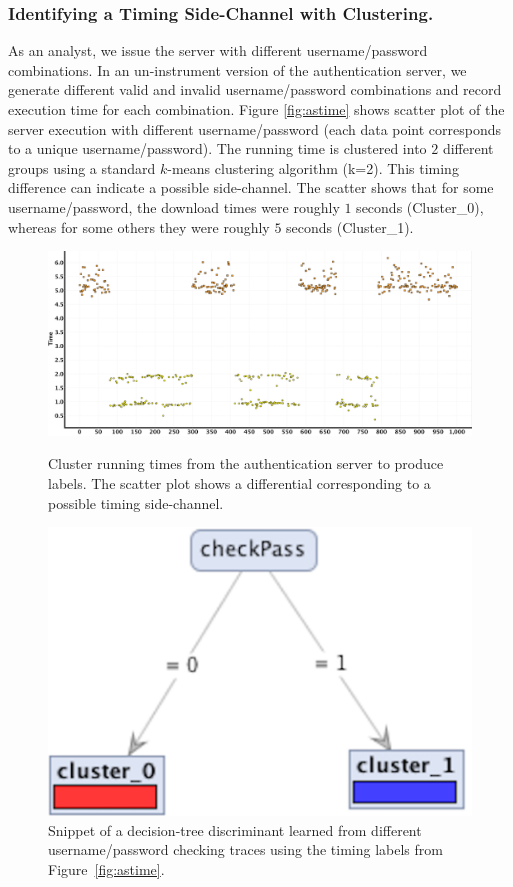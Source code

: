 \documentclass{article}
\begin{document}
\subsubsection*{Identifying a Timing Side-Channel with Clustering.}
As an analyst, we issue the server with different username/password combinations. In an
un-instrument version of the authentication server, we generate different valid and invalid
username/password combinations and record execution time for each combination.
Figure \ref{fig:astime} shows scatter plot of the server execution with different username/password 
(each data point corresponds to a unique username/password). The running time is
clustered into $2$ different groups using a standard $k$-means clustering algorithm (k=2). 
This timing difference can indicate a possible side-channel. The scatter shows that for some 
username/password, the download times were roughly $1$ seconds (Cluster\_0), whereas for
some others they were roughly $5$ seconds (Cluster\_1).

\begin{figure}[t]
\centering
\begin{minipage}[b]{0.5\textwidth}
  \centering
  \includegraphics[width=\textwidth]{User_Enumeration_2}
  \caption{Cluster running times from the authentication server to produce labels. The scatter plot shows a differential corresponding to a possible timing side-channel.}
  \label{fig:astime}
\end{minipage}\hfill
\begin{minipage}[b]{0.45\textwidth}
  \centering
  \includegraphics[width=0.6 \textwidth]{User_Enumeration_3}
  \caption{Snippet of a decision-tree discriminant learned from different username/password checking traces using the timing labels from Figure~\ref{fig:astime}.}
  \label{fig:asdectree}
\end{minipage}
\vspace{-1em}
\end{figure}
\end{document}
